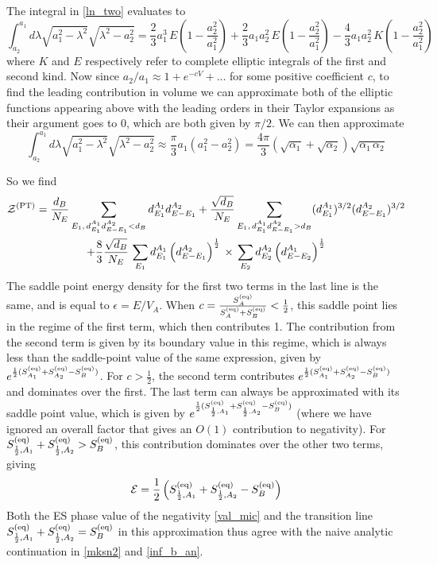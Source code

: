 \documentclass[a4paper,11pt]{article}
\newcommand\half{{\ensuremath{\frac{1}{2}}}}
\newcommand{\be}{\begin{equation}}
\newcommand{\ee}{\end{equation}}
\newcommand\ha{{\half}}
\newcommand\sE{{\ensuremath{{\mathcal E}}}}
\newcommand\sZ{{\mathcal Z}}
\begin{document}
\begin{enumerate}
\begin{appendix}
The integral in \eqref{ln_two} evaluates to 
\be 
 \int_{a_2}^{a_1} d\lambda \sqrt{a_1^2 -\lambda^2} \sqrt{\lambda^2 - a_2^2} = \frac{2}{3} a_1^3 \, E\left(1-\frac{a_2^2}{a_1^2}\right) + \frac{2}{3} a_1 a_2^2 \, E\left(1-\frac{a_2^2}{a_1^2}\right) - \frac{4}{3} a_1 a_2^2\, K\left(1-\frac{a_2^2}{a_1^2}\right)
\ee
where $K$ and $E$ respectively refer to complete elliptic integrals of the first and second kind. 
Now since $a_2/a_1 \approx 1 + e^{-c V}+...$ for some positive coefficient $c$, to find the leading contribution in volume we can approximate both of the elliptic functions appearing above with the leading orders in their Taylor expansions as their argument goes to 0, which are both given by $\pi/2$. We can then approximate 
\be 
\int_{a_2}^{a_1} d\lambda \sqrt{a_1^2 -\lambda^2} \sqrt{\lambda^2 - a_2^2} \approx \frac{\pi}{3} a_1 \left(a_1^2- a_2^2 \right) = \frac{4\pi}{3} (\sqrt{\alpha_1} + \sqrt{\alpha_2})\sqrt{\alpha_1\, \alpha_2}
\ee

So we find 
\be 
\begin{gathered} 
\sZ^{\rm (PT)} = \frac{d_B}{N_E}\sum_{E_1,\, d^{A_1}_{E_1}d^{A_2}_{E-E_1}< d_B} d^{A_1}_{E_1} d^{A_2}_{E-E_1} + \frac{\sqrt{d_B}}{N_E}\sum_{E_1, \, d^{A_1}_{E_1}d^{A_2}_{E-E_1}> d_B} (d^{A_1}_{E_1})^{3/2} (d^{A_2}_{E-E_1})^{3/2} \\
+ \frac{8}{3}\frac{\sqrt{d_B}}{N_E} \, \sum_{E_1} d^{A_1}_{E_1} \left( d^{A_2}_{E-E_1}\right)^{\frac{1}{2}} \, \times \, \sum_{E_2}d^{A_2}_{E_2} \left(d^{A_1}_{E-E_2}\right)^{\frac{1}{2}} \label{all_three}
\end{gathered} 
\ee
The saddle point energy density for the first two terms in the last line is the same, and is equal to $\epsilon = E/V_{A}$. When $c = \frac{S^{\rm (eq)}_{A}}{S^{\rm (eq)}_{A}+S^{\rm (eq)}_{B}}<\frac{1}{2}$, this saddle point lies in the regime of the first term, which then contributes 1. The contribution from the second term is given by its boundary value in this regime, which is always less than the saddle-point value of the same expression, given by 
$e^{\frac{1}{2}(S^{\rm (eq)}_{A_1} + S^{\rm (eq)}_{A_2} - S^{\rm (eq)}_{B})}$. 
For $c>\frac{1}{2}$, the second term contributes $e^{\frac{1}{2}(S^{\rm (eq)}_{A_1} + S^{\rm (eq)}_{A_2} - S^{\rm (eq)}_{B})}$ and dominates over the first. 
The last term can always be approximated with its saddle point value, which is given by 
$e^{{\frac{1}{2} (S^{\rm (eq)}_{\frac{1}{2}, A_1} + S^{\rm (eq)}_{\frac{1}{2}, A_2}- S^{\rm (eq)}_{B})}}$ (where we have ignored an overall factor that gives an $O(1)$ contribution to negativity). For $S^{\rm (eq)}_{\ha, A_1} + S^{\rm (eq)}_{\ha, A_2}> S^{\rm (eq)}_{B}$, 
this contribution dominates over the other two terms, giving 
\be 
\sE = \frac{1}{2} \left( S^{\rm (eq)}_{\frac{1}{2}, A_1} + S^{\rm (eq)}_{\frac{1}{2}, A_2}- S^{\rm (eq)}_{B} \right) \label{val_mic}
\ee
Both the ES phase value of the negativity \eqref{val_mic} and the transition line $S^{\rm (eq)}_{\ha, A_1} + S^{\rm (eq)}_{\ha, A_2} = S^{\rm (eq)}_{B}$ in this approximation thus agree with the naive analytic continuation in \eqref{mksn2} and \eqref{inf_b_an}. \\



\end{appendix}
\end{enumerate}
\end{document}
